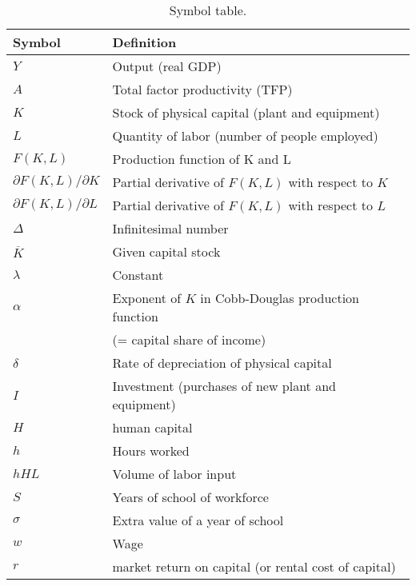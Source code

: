 \begin{table}[H]
\centering
\caption{Symbol table.}
\begin{tabular*}{0.98\textwidth}{l@{\extracolsep{\fill}}l}
\toprule
Symbol & Definition\\
\midrule
$Y$                            &Output (real GDP)\\
$A$                            &Total factor productivity (TFP)\\
$K$                            &Stock of physical capital  (plant and equipment)\\
$L$                            &Quantity of labor (number of people employed)\\
$F(K,L)$                    &Production function of K and L\\
$\partial F(K,L)/\partial K $             &    Partial derivative of $F(K,L)$ with respect to $K$\\
$\partial F(K,L)/\partial L $             &    Partial derivative of $F(K,L)$ with respect to $L$\\
$\Delta$                     &Infinitesimal number\\
$\overline{K}$                &Given capital stock\\
$\lambda$                     &Constant\\
$\alpha$                     &Exponent of $K$ in Cobb-Douglas   production function \\
                            &(= capital share of income)\\
$\delta$                     &Rate of depreciation of physical capital \\
$I$                            &Investment (purchases of new plant and equipment)\\
$H$                            &human capital\\
$h$                            &Hours worked\\
$hHL$                        &Volume of labor input\\
$S$                            &Years of school of workforce\\
$\sigma$                     &Extra value of a year    of school\\
$w$                            &Wage\\
$r$                            &market return  on capital (or rental cost of capital)\\
\bottomrule
\end{tabular*}
\end{table}


